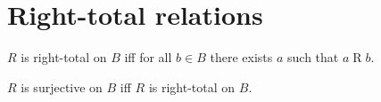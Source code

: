 \section{Right-total relations}

\begin{definition}\label{righttotal}
    $R$ is right-total on $B$ iff
    for all $b\in B$ there exists $a$ such that $a\mathrel{R} b$.
\end{definition}

\begin{abbreviation}\label{surjective}
    $R$ is surjective on $B$ iff $R$ is right-total on $B$.
\end{abbreviation}
